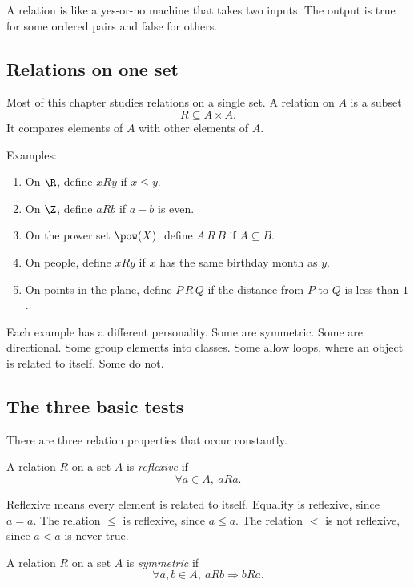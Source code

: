 \begin{intuitionbox}
A relation is like a yes-or-no machine that takes two inputs. The output is true for some ordered pairs and false for others.
\end{intuitionbox}

\subsection{Relations on one set}

Most of this chapter studies relations on a single set. A relation on $A$ is a subset
\[
R\subseteq A\times A.
\]
It compares elements of $A$ with other elements of $A$.

Examples:

\begin{enumerate}
\item On $\R$, define $xRy$ if $x\leq y$.
\item On $\Z$, define $aRb$ if $a-b$ is even.
\item On the power set $\pow(X)$, define $A\,R\,B$ if $A\subseteq B$.
\item On people, define $xRy$ if $x$ has the same birthday month as $y$.
\item On points in the plane, define $P\,R\,Q$ if the distance from $P$ to $Q$ is less than $1$.
\end{enumerate}

Each example has a different personality. Some are symmetric. Some are directional. Some group elements into classes. Some allow loops, where an object is related to itself. Some do not.

\subsection{The three basic tests}

There are three relation properties that occur constantly.

\begin{definition}
A relation $R$ on a set $A$ is \emph{reflexive} if
\[
\forall a\in A,\ aRa.
\]
\end{definition}

Reflexive means every element is related to itself. Equality is reflexive, since $a=a$. The relation $\leq$ is reflexive, since $a\leq a$. The relation $<$ is not reflexive, since $a<a$ is never true.

\begin{definition}
A relation $R$ on a set $A$ is \emph{symmetric} if
\[
\forall a,b\in A,\ aRb\Rightarrow bRa.
\]
\end{definition}

